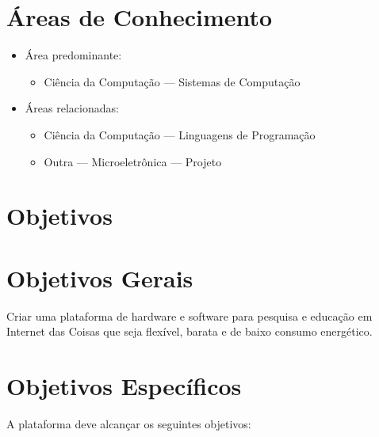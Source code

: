 \documentclass[titlepage,12pt]{article}
\begin{document}

\section{Áreas de Conhecimento}

\begin{itemize}
\item Área predominante:
    \begin{itemize}
    \item Ciência da Computação --- Sistemas de Computação     
    \end{itemize}
\item Áreas relacionadas:
    \begin{itemize}
    \item Ciência da Computação --- Linguagens de Programação
    \item Outra --- Microeletrônica --- Projeto
    \end{itemize}
\end{itemize}


\section{ Objetivos }

\section{ Objetivos Gerais }

Criar uma plataforma de hardware e software para pesquisa e educação em
Internet das Coisas que seja flexível, barata e de baixo consumo energético.

\section{ Objetivos Específicos }

A plataforma deve alcançar os seguintes objetivos:
\end{document}
